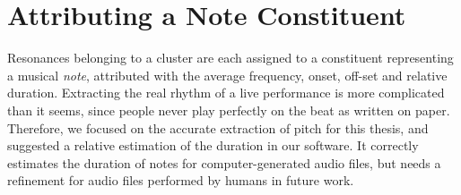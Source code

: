 \section{Attributing a Note Constituent}
Resonances belonging to a cluster are each assigned to a constituent representing a musical \textit{note}, attributed with the average frequency, onset, off-set and relative duration. Extracting the real rhythm of a live performance is more complicated than it seems, since people never play perfectly on the beat as written on paper. Therefore, we focused on the accurate extraction of pitch for this thesis, and suggested a relative estimation of the duration in our software. It correctly estimates the duration of notes for computer-generated audio files, but needs a refinement for audio files performed by humans in future work. 


